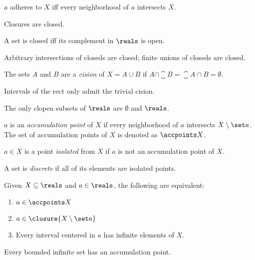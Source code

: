 \begin{theorem}
	$a$ adheres to $X$ iff every neighborhood of $a$ intersects $X$.
\end{theorem}

\begin{corollary}
	Closures are closed.
\end{corollary}

\begin{theorem}
	A set is closed iff its complement in $\reals$ is open.
\end{theorem}

\begin{theorem}
	Arbitrary intersections of closeds are closed; finite unions of closeds are closed. 
\end{theorem}

\begin{definition}[Cision]
	The sets $A$ and $B$ are a \emph{cision} of $X = A \cup B$ if
	$A \cap \closure B = \closure A \cap B = \emptyset$.
\end{definition}

\begin{theorem}
	Intervals of the rect only admit the trivial cision.
\end{theorem}

\begin{corollary}
	The only clopen subsets of $\reals$ are $\emptyset$ and $\reals$.
\end{corollary}

\begin{definition}
	$a$ is an \emph{accumulation point} of $X$ if every neighborhood of $a$ intersects $X \setminus \set a$. The set of accumulation points of $X$ is denoted as $\accpoints X$.
\end{definition}

\begin{definition}
	$a \in X$ is a point \emph{isolated} from $X$ if $a$ is not an accumulation point of $X$.
\end{definition}

\begin{definition}
	A set is \emph{discrete} if all of its elements are isolated points.
\end{definition}

\begin{theorem}
	Given $X \subseteq \reals$ and $a \in \reals$, the following are equivalent:
	\begin{enumerate}
		\item $a \in \accpoints X$
		\item $a \in \closure{X \setminus \set a}$
		\item Every interval centered in $a$ has infinite elements of $X$.
	\end{enumerate}
\end{theorem}

\begin{theorem}
	Every bounded infinite set has an accumulation point.
\end{theorem}